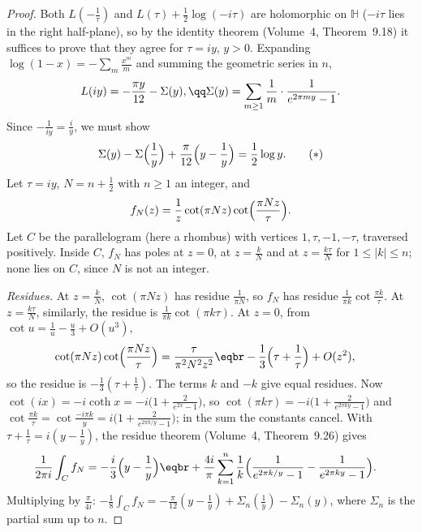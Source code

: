 \begin{proof}
Both $L(-\frac1\tau)$ and $L(\tau)+\frac12\log(-i\tau)$ are holomorphic on $\mathbb H$ ($-i\tau$ lies in the right half-plane), so by the identity theorem (Volume~4, Theorem~9.18) it suffices to prove that they agree for $\tau=iy$, $y>0$.
Expanding $\log(1-x)=-\sum_m\frac{x^m}m$ and summing the geometric series in $n$,
\[
L(iy)=-\frac{\pi y}{12}-\Sigma(y),\qq\Sigma(y)=\sum_{m\ge1}\frac1m\cdot\frac1{e^{2\pi my}-1}.
\]
Since $-\frac1{iy}=\frac iy$, we must show
\[
\Sigma(y)-\Sigma\Bigl(\frac1y\Bigr)+\frac\pi{12}\Bigl(y-\frac1y\Bigr)=\frac12\log y.\tag{$\ast$}
\]
Let $\tau=iy$, $N=n+\frac12$ with $n\ge1$ an integer, and
\[
f_N(z)=\frac1z\cot(\pi Nz)\cot\Bigl(\frac{\pi Nz}\tau\Bigr).
\]
Let $C$ be the parallelogram (here a rhombus) with vertices $1,\tau,-1,-\tau$, traversed positively. Inside $C$, $f_N$ has poles at $z=0$, at $z=\frac kN$ and at $z=\frac{k\tau}N$ for $1\le|k|\le n$; none lies on $C$, since
$N$ is not an integer.

\emph{Residues.} At $z=\frac kN$, $\cot(\pi Nz)$ has residue $\frac1{\pi N}$, so $f_N$ has residue $\frac1{\pi k}\cot\frac{\pi k}\tau$. At $z=\frac{k\tau}N$, similarly, the residue is $\frac1{\pi k}\cot(\pi k\tau)$. At $z=0$, from
$\cot u=\frac1u-\frac u3+O(u^3)$,
\[
\begin{aligned}\cot(\pi Nz)\cot\Bigl(\frac{\pi Nz}\tau\Bigr)&=\frac\tau{\pi^2N^2z^2}\eqbr-\frac13\Bigl(\tau+\frac1\tau\Bigr)+O(z^2),\end{aligned}
\]
so the residue is $-\frac13(\tau+\frac1\tau)$. The terms $k$ and $-k$ give equal residues. Now $\cot(ix)=-i\coth x=-i\bigl(1+\frac2{e^{2x}-1}\bigr)$, so $\cot(\pi k\tau)=-i\bigl(1+\frac2{e^{2\pi ky}-1}\bigr)$ and
$\cot\frac{\pi k}\tau=\cot\frac{-i\pi k}y=i\bigl(1+\frac2{e^{2\pi k/y}-1}\bigr)$; in the sum the constants cancel. With $\tau+\frac1\tau=i(y-\frac1y)$, the residue theorem (Volume~4, Theorem~9.26) gives
\[
\begin{aligned}\frac1{2\pi i}\int_Cf_N&=-\frac i3\Bigl(y-\frac1y\Bigr)\eqbr+\frac{4i}\pi\sum_{k=1}^n\frac1k\Bigl(\frac1{e^{2\pi k/y}-1}-\frac1{e^{2\pi ky}-1}\Bigr).\end{aligned}
\]
Multiplying by $\frac\pi{4i}$: $-\frac18\int_Cf_N=-\frac\pi{12}(y-\frac1y)+\Sigma_n(\frac1y)-\Sigma_n(y)$, where $\Sigma_n$ is the partial sum up to $n$.


\end{proof}
